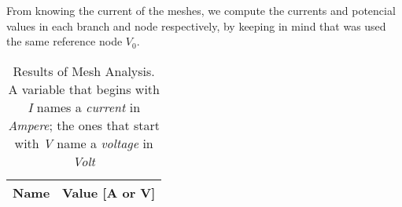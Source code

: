 From knowing the current of the meshes, we compute the currents and  potencial values in each branch and node respectively, by keeping in mind that was used the same reference node $V_0$.


\begin{table}[h]
  \centering
  \begin{tabular}{|l|r|}
    \hline
    {\bf Name} & {\bf Value [A or V]} \\ \hline
    
  \end{tabular}
  \caption{Results of Mesh Analysis. A variable that begins  with \textit{I} names a \textit{current} in \textit{Ampere}; the ones that start with \textit{V} name a \textit{voltage} in \textit{Volt}}
  \label{tab:op_mesh_tab}
\end{table}




